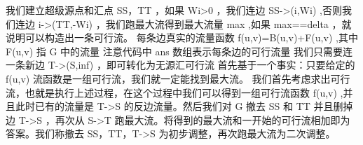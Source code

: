 {}我们建立超级源点和汇点\markdownRendererDollarSign{} SS，TT\markdownRendererSoftLineBreak
{}\markdownRendererDollarSign{}，如果\markdownRendererDollarSign{} Wi>0 \markdownRendererDollarSign{}，我们连边\markdownRendererDollarSign{} SS->(i,Wi) \markdownRendererDollarSign{},否则我们连边\markdownRendererDollarSign{} i->(TT,-Wi) \markdownRendererDollarSign{}，我们跑最大流得到最大流量\markdownRendererDollarSign{} max\markdownRendererSoftLineBreak
{}\markdownRendererDollarSign{},如果\markdownRendererDollarSign{} max==\markdownRendererBackslash{}delta \markdownRendererDollarSign{}，就说明可以构造出一条可行流。\markdownRendererParagraphSeparator
{}每条边真实的流量函数\markdownRendererDollarSign{} f(u,v)=B(u,v)+F(u,v) \markdownRendererDollarSign{},其中\markdownRendererDollarSign{} F(u,v) \markdownRendererDollarSign{}指\markdownRendererDollarSign{} G \markdownRendererDollarSign{}中的流量\markdownRendererInterblockSeparator
{}\markdownRendererInterblockSeparator
{}注意代码中\markdownRendererDollarSign{} ans \markdownRendererDollarSign{}数组表示每条边的可行流量\markdownRendererInterblockSeparator
{}
\markdownRendererSectionEnd \markdownRendererSectionBegin
{}\markdownRendererInterblockSeparator
{}我们只需要连一条新边\markdownRendererDollarSign{} T->(S,inf) \markdownRendererDollarSign{}，即可转化为无源汇可行流\markdownRendererInterblockSeparator
{}
\markdownRendererSectionEnd \markdownRendererSectionBegin
{}\markdownRendererInterblockSeparator
{}首先基于一个事实：只要给定的\markdownRendererDollarSign{} f(u,v) \markdownRendererDollarSign{}流函数是一组可行流，我们就一定能找到最大流。\markdownRendererParagraphSeparator
{}我们首先考虑求出可行流，也就是执行上述过程，在这个过程中我们可以得到一组可行流函数\markdownRendererDollarSign{} f(u,v) \markdownRendererDollarSign{},并且此时已有的流量是\markdownRendererDollarSign{} T->S \markdownRendererDollarSign{}的反边流量。然后我们对\markdownRendererDollarSign{} G \markdownRendererDollarSign{}撤去\markdownRendererDollarSign{} SS \markdownRendererDollarSign{}和\markdownRendererDollarSign{} TT \markdownRendererDollarSign{}并且删掉边\markdownRendererDollarSign{} T->S \markdownRendererDollarSign{}，再次从\markdownRendererDollarSign{} S->T \markdownRendererDollarSign{}跑最大流。将得到的最大流和一开始的可行流相加即为答案。我们称撤去\markdownRendererDollarSign{} SS，TT，T->S \markdownRendererDollarSign{}为初步调整，再次跑最大流为二次调整。\markdownRendererParagraphSeparator
